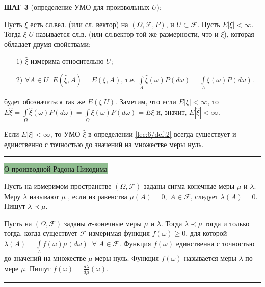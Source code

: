\textbf{ШАГ 3} (определение УМО для произвольных $U$):
\begin{definition}\label{lec:6/def:2}
	Пусть $\xi$ есть сл.вел. (или сл. вектор) на $(\Omega, \mathcal{F},P)$, и $U \subset \mathcal{F}$. Пусть $E|\xi|<\infty$. Тогда  $\xi$  $U$ называется сл.в. (или сл.вектор той же размерности, что и $\xi$), которая обладает двумя свойствами:
	\begin{itemize}
		\item[$1)$] $\hat{\xi}$ измерима относительно $U$;
		\item[$2)$] $\forall A\in U\;\; E(\hat{\xi}, A) = E(\xi, A)$, т.е.
		$\displaystyle \int\limits^{}_{A}\hat{\xi}(\omega)P(d\omega) = \int\limits^{}_{A}\xi(\omega) P(d\omega)$.
	\end{itemize}
\end{definition}

 будет обозначаться так же $E(\xi|U)$. Заметим, что если $E|\xi|<\infty$, то $\displaystyle E\hat{\xi} = \int\limits^{}_{\Omega}\hat{\xi}(\omega)P(d\omega) = \int\limits^{}_{\Omega}\xi(\omega)P(d\omega) = E\xi$ и, значит, $E|\hat{\xi}| < \infty$.

\begin{theorem}\label{lec:6/the:1}
	Если $E|\xi| < \infty$, то УМО $\hat{\xi}$ в определении \ref{lec:6/def:2} всегда существует и единственно с точностью до значений на множестве меры нуль.
\end{theorem}

\noindent\rule{\textwidth}{1pt}
\colorbox{DarkSeaGreen}{О производной Радона-Никодима}
\begin{definition}
	Пусть на измеримом пространстве $(\Omega, \mathcal{F})$ заданы сигма-конечные меры $\mu$ и $\lambda$. Меру $\lambda$ называют  $\mu$ , если из равенства $\mu(A) = 0, \; A \in \mathcal{F}$, следует $\lambda(A) = 0$. Пишут $ \lambda \prec \mu$.
\end{definition}
	
\begin{theorem}
	Пусть на $(\Omega, \mathcal{F})$ заданы $\sigma$-конечные меры $\mu$ и $\lambda$. Тогда $\lambda \prec \mu$ тогда и только тогда, когда существует $\mathcal{F}$-измеримая функция $f(\omega) \geq 0$, для которой $\displaystyle \lambda(A) = \int\limits^{}_{A}f(\omega)\mu(d\omega)\; \; \forall \; A \in \mathcal{F}$.
	Функция $f(\omega)$ единственна с точностью до значений на множестве $\mu$-меры нуль. Функция $f(\omega)$ называется  меры $\lambda$ по мере $\mu$. Пишут $f(\omega)= \frac{d\lambda}{d\mu}(\omega)$.
\end{theorem}
\noindent\rule{\textwidth}{1pt}

